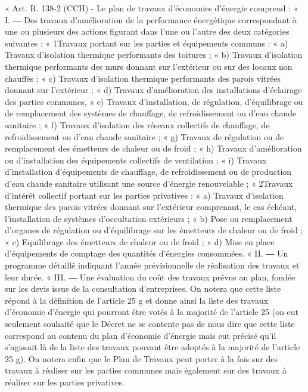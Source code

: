 		« Art. R. 138-2 (CCH) - Le plan de travaux d'économies d'énergie comprend : « I. ― Des travaux d'amélioration de la performance énergétique correspondant à une ou plusieurs des actions figurant dans l'une ou l'autre des deux catégories suivantes : « 1\degres Travaux portant sur les parties et équipements communs : « a) Travaux d'isolation thermique performants des toitures ; « b) Travaux d'isolation thermique performants des murs donnant sur l'extérieur ou sur des locaux non chauffés ; « c) Travaux d'isolation thermique performants des parois vitrées donnant sur l'extérieur ; « d) Travaux d'amélioration des installations d'éclairage des parties communes, « e) Travaux d'installation, de régulation, d'équilibrage ou de remplacement des systèmes de chauffage, de refroidissement ou d'eau chaude sanitaire ; « f) Travaux d'isolation des réseaux collectifs de chauffage, de refroidissement ou d'eau chaude sanitaire ; « g) Travaux de régulation ou de remplacement des émetteurs de chaleur ou de froid ; « h) Travaux d'amélioration ou d'installation des équipements collectifs de ventilation ; « i) Travaux d'installation d'équipements de chauffage, de refroidissement ou de production d'eau chaude sanitaire utilisant une source d'énergie renouvelable ; « 2\degres Travaux d'intérêt collectif portant sur les parties privatives : « a) Travaux d'isolation thermique des parois vitrées donnant sur l'extérieur comprenant, le cas échéant, l'installation de systèmes d'occultation extérieurs ; « b) Pose ou remplacement d'organes de régulation ou d'équilibrage sur les émetteurs de chaleur ou de froid ; « c) Equilibrage des émetteurs de chaleur ou de froid ; « d) Mise en place d'équipements de comptage des quantités d'énergies consommées. « II. ― Un programme détaillé indiquant l'année prévisionnelle de réalisation des travaux et leur durée. « III. ― Une évaluation du coût des travaux prévus au plan, fondée sur les devis issus de la consultation d'entreprises.
		On notera que cette liste répond à la définition de l’article 25 g et donne ainsi la liste des travaux d’économie d’énergie qui pourront être votés à la majorité de l’article 25 (on eut seulement souhaité que le Décret ne se contente pas de nous dire que cette liste correspond au contenu du plan d’économie d’énergie mais eut précisé qu’il s’agissait là de la liste des travaux pouvant être adoptés à la majorité de l’article 25 g).
		On notera enfin que le Plan de Travaux peut porter à la fois sur des travaux à réaliser sur les parties communes mais également sur des travaux à réaliser sur les parties privatives.
		
